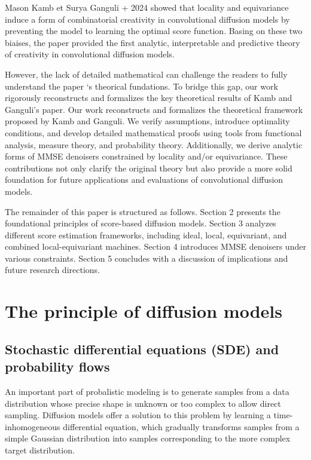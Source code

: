 \documentclass[a4paper,10pt]{article}
\theoremstyle{definition} %
\theoremstyle{definition} %
\theoremstyle{definition} %
\theoremstyle{definition} %
\begin{document}
Mason Kamb et Surya Ganguli + 2024 showed that locality and equivariance induce a form of combinatorial creativity in convolutional diffusion models by preventing the model to learning the optimal score function. Basing on these two biaises, the paper provided the first analytic, interpretable and predictive theory of creativity in convolutional diffusion models. 

However, the lack of detailed mathematical can challenge the readers to fully understand the paper ‘s theorical fundations. To bridge this gap, our work rigorously reconstructs and formalizes the key theoretical results of Kamb and Ganguli's paper. Our work reconstructs and formalizes the theoretical framework proposed by Kamb and Ganguli. We verify assumptions, introduce optimality conditions, and develop detailed mathematical proofs using tools from functional analysis, measure theory, and probability theory. Additionally, we derive analytic forms of MMSE denoisers constrained by locality and/or equivariance. These contributions not only clarify the original theory but also provide a more solid foundation for future applications and evaluations of convolutional diffusion models.

The remainder of this paper is structured as follows. Section 2 presents the foundational principles of score-based diffusion models. Section 3 analyzes different score estimation frameworks, including ideal, local, equivariant, and combined local-equivariant machines. Section 4 introduces MMSE denoisers under various constraints. Section 5 concludes with a discussion of implications and future research directions.
\section{The principle of diffusion models}

\subsection{Stochastic differential equations (SDE) and probability flows}

An important part of probalistic modeling is to generate samples from a data distribution whose precise shape is unknown or too complex to allow direct sampling. Diffusion models offer a solution to this problem by learning a time-inhomogeneous differential equation, which gradually transforms samples from a simple Gaussian distribution into samples corresponding to the more complex target distribution.
\end{document}

